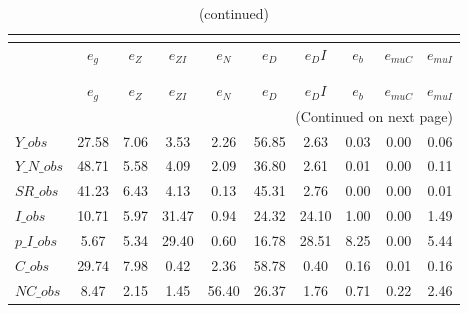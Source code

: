  
\begin{center}
\begin{longtable}{lccccccccc} 
\caption{VARIANCE DECOMPOSITION (in percent)}\\
 \label{Table:th_var_decomp_uncond}\\
\toprule 
$               $	 & 	 $        {e_g}$	 & 	 $        {e_Z}$	 & 	 $     {e_{ZI}}$	 & 	 $        {e_N}$	 & 	 $        {e_D}$	 & 	 $       {e_DI}$	 & 	 $        {e_b}$	 & 	 $    {e_{muC}}$	 & 	 $    {e_{muI}}$\\
\midrule \endfirsthead 
\caption{(continued)}\\
 \toprule \\ 
$               $	 & 	 $        {e_g}$	 & 	 $        {e_Z}$	 & 	 $     {e_{ZI}}$	 & 	 $        {e_N}$	 & 	 $        {e_D}$	 & 	 $       {e_DI}$	 & 	 $        {e_b}$	 & 	 $    {e_{muC}}$	 & 	 $    {e_{muI}}$\\
\midrule \endhead 
\midrule \multicolumn{10}{r}{(Continued on next page)} \\ \bottomrule \endfoot 
\bottomrule \endlastfoot 
$Y\_obs         $	 & 	        27.58	 & 	         7.06	 & 	         3.53	 & 	         2.26	 & 	        56.85	 & 	         2.63	 & 	         0.03	 & 	         0.00	 & 	         0.06 \\ 
$Y\_N\_obs      $	 & 	        48.71	 & 	         5.58	 & 	         4.09	 & 	         2.09	 & 	        36.80	 & 	         2.61	 & 	         0.01	 & 	         0.00	 & 	         0.11 \\ 
$SR\_obs        $	 & 	        41.23	 & 	         6.43	 & 	         4.13	 & 	         0.13	 & 	        45.31	 & 	         2.76	 & 	         0.00	 & 	         0.00	 & 	         0.01 \\ 
$I\_obs         $	 & 	        10.71	 & 	         5.97	 & 	        31.47	 & 	         0.94	 & 	        24.32	 & 	        24.10	 & 	         1.00	 & 	         0.00	 & 	         1.49 \\ 
$p\_I\_obs      $	 & 	         5.67	 & 	         5.34	 & 	        29.40	 & 	         0.60	 & 	        16.78	 & 	        28.51	 & 	         8.25	 & 	         0.00	 & 	         5.44 \\ 
$C\_obs         $	 & 	        29.74	 & 	         7.98	 & 	         0.42	 & 	         2.36	 & 	        58.78	 & 	         0.40	 & 	         0.16	 & 	         0.01	 & 	         0.16 \\ 
$NC\_obs        $	 & 	         8.47	 & 	         2.15	 & 	         1.45	 & 	        56.40	 & 	        26.37	 & 	         1.76	 & 	         0.71	 & 	         0.22	 & 	         2.46 \\ 

\end{longtable}
\end{center}
